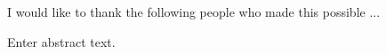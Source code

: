 \documentclass[11pt]{report}
\begin{document}
\acknowledgementspage

\noindent I would like to thank the following people who made this possible ...


\tableofcontents

\listoftables

\listoffigures

\abstractpage

Enter abstract text.

\startofchapters









\appendix
\appendixeqnumbering












\end{document}
